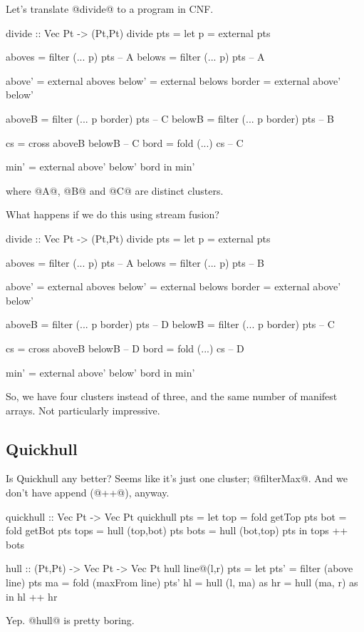 Let's translate @divide@ to a program in CNF.
\begin{code}
divide :: Vec Pt -> (Pt,Pt)
divide pts
 = let p      = external pts

       aboves = filter (... p) pts          -- A
       belows = filter (... p) pts          -- A

       above' = external aboves
       below' = external belows
       border = external above' below'

       aboveB = filter (... p border) pts   -- C
       belowB = filter (... p border) pts   -- B

       cs     = cross  aboveB belowB        -- C
       bord   = fold   (...) cs             -- C

       min'   = external above' below' bord
   in  min'
\end{code}
where @A@, @B@ and @C@ are distinct clusters.

What happens if we do this using stream fusion?
\begin{code}
divide :: Vec Pt -> (Pt,Pt)
divide pts
 = let p      = external pts

       aboves = filter (... p) pts          -- A
       belows = filter (... p) pts          -- B

       above' = external aboves
       below' = external belows
       border = external above' below'


       aboveB = filter (... p border) pts   -- D
       belowB = filter (... p border) pts   -- C

       cs     = cross  aboveB belowB        -- D
       bord   = fold   (...) cs             -- D

       min'   = external above' below' bord
   in  min'
\end{code}
So, we have four clusters instead of three, and the same number of manifest arrays. Not particularly impressive.

\subsection{Quickhull}
Is Quickhull any better? Seems like it's just one cluster; @filterMax@. And we don't have append (@++@), anyway.
\begin{code}
quickhull :: Vec Pt -> Vec Pt
quickhull pts
 = let top  = fold getTop pts
       bot  = fold getBot pts
       tops = hull (top,bot) pts
       bots = hull (bot,top) pts
   in  tops ++ bots

hull :: (Pt,Pt) -> Vec Pt -> Vec Pt
hull line@(l,r) pts
 = let pts' = filter (above   line) pts
       ma   = fold   (maxFrom line) pts'
       hl   = hull   (l, ma)        as
       hr   = hull   (ma, r)        as
   in  hl  ++ hr
\end{code}
Yep. @hull@ is pretty boring.

